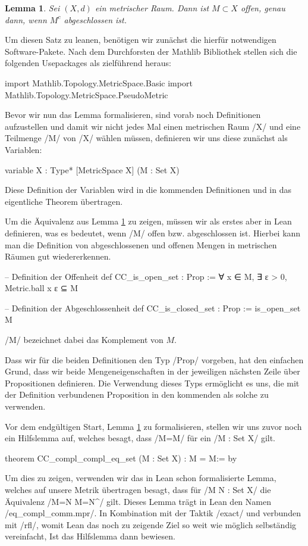 \documentclass[10pt]{article}
\newtheorem{lemma}[satz]{Lemma}
\begin{document}
\begin{lemma}\label{satz1}
Sei $(X,d)$ ein metrischer Raum. Dann ist $M\subset X$ offen, genau dann, wenn $M^c$ abgeschlossen ist.   
\end{lemma}
\noindent Um diesen Satz zu leanen, benötigen wir zunächst die hierfür notwendigen Software-Pakete. Nach dem Durchforsten der Mathlib Bibliothek stellen sich die folgenden Usepackages als zielführend heraus:
\begin{leancode}
import Mathlib.Topology.MetricSpace.Basic
import Mathlib.Topology.MetricSpace.PseudoMetric
\end{leancode}
\noindent Bevor wir nun das Lemma formalisieren, sind vorab noch Definitionen aufzustellen und damit wir nicht jedes Mal einen metrischen Raum \lean/X/ und eine Teilmenge \lean/M/ von \lean/X/ wählen müssen, definieren wir uns diese zunächst als Variablen:
\begin{leancode}
variable {X : Type*} [MetricSpace X] (M : Set X)
\end{leancode}
\noindent Diese Definition der Variablen wird in die kommenden Definitionen und in das eigentliche Theorem übertragen.

\noindent Um die Äquivalenz aus Lemma \ref{satz1} zu zeigen, müssen wir als erstes aber in Lean definieren, was es bedeutet, wenn \lean/M/ offen bzw. abgeschlossen ist. Hierbei kann man die Definition von abgeschlossenen und offenen Mengen in metrischen Räumen gut wiedererkennen. 
\begin{leancode}
-- Definition der Offenheit
def CC_is_open_set : Prop :=
  ∀ x ∈ M, ∃ ε > 0, Metric.ball x ε ⊆ M
  
-- Definition der Abgeschlossenheit
def CC_is_closed_set : Prop :=
  is_open_set M\compl
\end{leancode}
\noindent \lean/M\compl/ bezeichnet dabei das Komplement von $M$.

\noindent Dass wir für die beiden Definitionen den Typ \lean/Prop/ vorgeben, hat den einfachen Grund, dass wir beide Mengeneigenschaften in der jeweiligen nächsten Zeile über Propositionen definieren. Die Verwendung dieses Typs ermöglicht es uns, die mit der Definition verbundenen Proposition in den kommenden als solche zu verwenden.

\noindent Vor dem endgültigen Start, Lemma \ref{satz1} zu formalisieren, stellen wir uns zuvor noch ein Hilfslemma auf, welches besagt, dass \lean/M=M\compl\compl/ für ein \lean/M : Set X/ gilt.
\begin{leancode}
theorem CC_compl_compl_eq_set (M : Set X) : M = M\compl\compl := by
\end{leancode}
\noindent Um dies zu zeigen, verwenden wir das in Lean schon formalisierte Lemma, welches auf unsere Metrik übertragen besagt, dass für \lean/M N : Set X/ die Äquivalenz \lean/M\compl=N \Leftrightarrow M=N^\compl/ gilt. Dieses Lemma trägt in Lean den Namen \lean/eq_compl_comm.mpr/. In Kombination mit der Taktik \lean/exact/ und verbunden mit \lean/rfl/, womit Lean das noch zu zeigende Ziel so weit wie möglich selbständig vereinfacht, Ist das Hilfslemma dann bewiesen.
\end{document}
